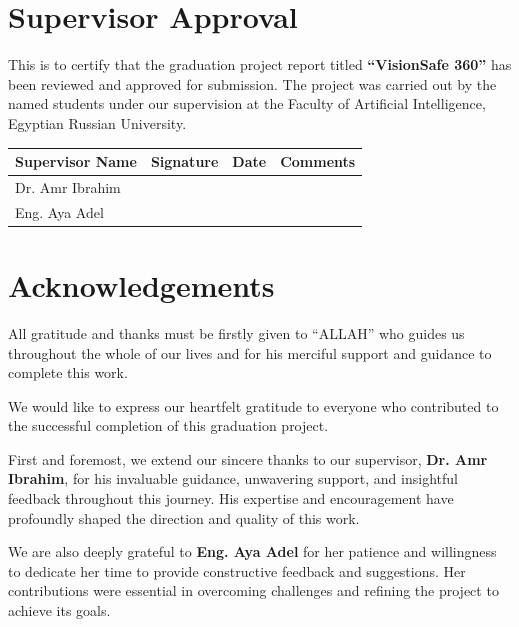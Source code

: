 \chapter*{Supervisor Approval}

This is to certify that the graduation project report titled \textbf{``VisionSafe 360''} has been reviewed and approved for submission. The project was carried out by the named students under our supervision at the Faculty of Artificial Intelligence, Egyptian Russian University.

\begin{table}[H]
\centering
\begin{tabular}{|l|l|l|l|}
\hline
\textbf{Supervisor Name} & \textbf{Signature} & \textbf{Date} & \textbf{Comments} \\
\hline
Dr. Amr Ibrahim &  &  &  \\
\hline
Eng. Aya Adel &  &  &  \\
\hline
\end{tabular}
\end{table}

\chapter*{Acknowledgements}

All gratitude and thanks must be firstly given to ``ALLAH'' who guides us throughout the whole of our lives and for his merciful support and guidance to complete this work.

We would like to express our heartfelt gratitude to everyone who contributed to the successful completion of this graduation project.

First and foremost, we extend our sincere thanks to our supervisor, \textbf{Dr. Amr Ibrahim}, for his invaluable guidance, unwavering support, and insightful feedback throughout this journey. His expertise and encouragement have profoundly shaped the direction and quality of this work.

We are also deeply grateful to \textbf{Eng. Aya Adel} for her patience and willingness to dedicate her time to provide constructive feedback and suggestions. Her contributions were essential in overcoming challenges and refining the project to achieve its goals.

